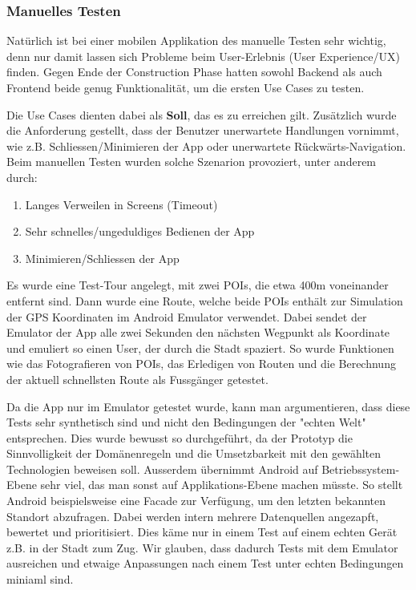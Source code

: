 \subsubsection{Manuelles Testen}\label{manuelles_testen_frontend}
Natürlich ist bei einer mobilen Applikation des manuelle Testen sehr wichtig, denn nur damit lassen
sich Probleme beim User-Erlebnis (User Experience/UX) finden. Gegen Ende der Construction Phase
hatten sowohl Backend als auch Frontend beide genug Funktionalität, um die ersten Use Cases zu testen.

Die Use Cases dienten dabei als \textbf{Soll}, das es zu erreichen gilt. Zusätzlich wurde die Anforderung
gestellt, dass der Benutzer unerwartete Handlungen vornimmt, wie z.B. Schliessen/Minimieren der App oder
unerwartete Rückwärts-Navigation. Beim manuellen Testen wurden solche Szenarion provoziert, unter anderem
durch:

\begin{enumerate}
  \item Langes Verweilen in Screens (Timeout)
  \item Sehr schnelles/ungeduldiges Bedienen der App
  \item Minimieren/Schliessen der App
\end{enumerate}

Es wurde eine Test-Tour angelegt, mit zwei POIs, die etwa 400m voneinander entfernt sind. Dann wurde
eine Route, welche beide POIs enthält zur Simulation der GPS Koordinaten im Android Emulator verwendet.
Dabei sendet der Emulator der App alle zwei Sekunden den nächsten Wegpunkt als Koordinate und emuliert
so einen User, der durch die Stadt spaziert. So wurde Funktionen wie das Fotografieren von POIs, das
Erledigen von Routen und die Berechnung der aktuell schnellsten Route als Fussgänger getestet.

Da die App nur im Emulator getestet wurde, kann man argumentieren, dass diese Tests sehr synthetisch
sind und nicht den Bedingungen der "echten Welt" entsprechen. Dies wurde bewusst so durchgeführt, da
der Prototyp die Sinnvolligkeit der Domänenregeln und die Umsetzbarkeit mit den gewählten Technologien
beweisen soll.
Ausserdem übernimmt Android auf Betriebssystem-Ebene sehr viel, das man sonst auf Applikations-Ebene
machen müsste. So stellt Android beispielsweise eine Facade zur Verfügung, um den letzten bekannten
Standort abzufragen. Dabei werden intern mehrere Datenquellen angezapft, bewertet und prioritisiert.
Dies käme nur in einem Test auf einem echten Gerät z.B. in der Stadt zum Zug. Wir glauben, dass dadurch
Tests mit dem Emulator ausreichen und etwaige Anpassungen nach einem Test unter echten Bedingungen
miniaml sind.

